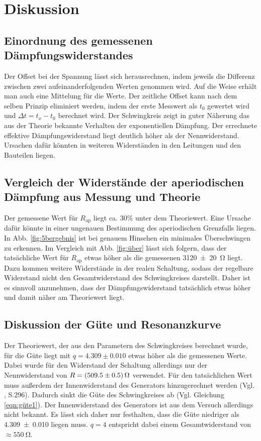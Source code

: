 \section{Diskussion}
\label{sec:Diskussion}
\subsection{Einordnung des gemessenen Dämpfungswiderstandes}
Der Offset bei der Spannung lässt sich herausrechnen, indem jeweils die Differenz
zwischen zwei aufeinanderfolgenden Werten genommen wird. Auf die Weise erhält man
auch eine Mittelung für die Werte. Der zeitliche Offset kann nach dem
selben Prinzip eliminiert werden, indem der erste Messwert als $t_0$ gewertet
wird und $\Delta t = t_x - t_0$ berechnet wird.
Der Schwingkreis zeigt in guter Näherung das aus der Theorie bekannte
Verhalten der exponentiellen Dämpfung. Der errechnete effektive
Dämpfungswiderstand liegt deutlich höher als der Nennwiderstand.
Ursachen dafür könnten in weiteren Widerständen in den Leitungen und den
Bauteilen liegen.

\subsection{Vergleich der Widerstände der aperiodischen Dämpfung
aus Messung und Theorie}
Der gemessene Wert für $R_\text{ap}$ liegt ca. 30\% unter dem Theoriewert.
Eine Ursache dafür könnte in einer ungenauen Bestimmung des aperiodischen
Grenzfalls liegen. In Abb. \ref{fig:5bergebnis} ist bei genauem Hinsehen ein
minimales Überschwingen zu erkennen. Im Vergleich mit Abb. \ref{fig:über}
lässt sich folgern, dass der tatsächliche Wert für $R_\text{ap}$ etwas höher
als die gemessenen \SI{3120 +- 20}{\ohm} liegt.
Dazu kommen weitere Widerstände in der realen Schaltung, sodass der regelbare
Widerstand nicht den Gesamtwiderstand des Schwingkreises darstellt.
Daher ist es sinnvoll anzunehmen, dass der Dämpfungswiderstand tatsächlich
etwas höher und damit näher am Theoriewert liegt.

\subsection{Diskussion der Güte und Resonanzkurve}
Der Theoriewert, der aus den Parametern des Schwingkreises
berechnet wurde, für die Güte liegt mit $q = 4.309 \pm 0.010$ etwas höher
als die gemessenen Werte. Dabei wurde für den Widerstand der Schaltung allerdings
nur der Nennwiderstand von $R=\SI{509.5+-0.5}{\ohm}$ verwendet. Für den
tatsächlichen Wert muss außerdem der Innenwiderstand des Generators
hinzugerechnet werden (Vgl. \cite{officialmanual}, S.296). Dadurch
sinkt die Güte des Schwingkreises ab (Vgl. Gleichung \ref{eqn:güte1}).
Der Innenwiderstand des Generators ist aus dem Versuch allerdings nicht
bekannt. Es lässt
sich daher nur festhalten, dass die Güte niedriger als \num{4.309 \pm 0.010}
liegen muss. $q=4$ entspricht dabei
einem Gesamtwiderstand von $\approx \SI{550}{\ohm}$.

